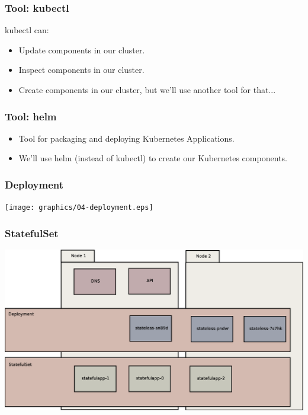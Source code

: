     \begin{frame}
        \frametitle{Tool: kubectl\footnotemark}
        kubectl can:
        \begin{itemize}
            \item Update components in our cluster.\pause
            \item Inspect components in our cluster.\pause
            \item Create components in our cluster, but we'll use another tool for that...
        \end{itemize}
    \end{frame}

    \begin{frame}
        \frametitle{Tool: helm\footnotemark}
        \begin{itemize}
            \item Tool for packaging and deploying Kubernetes Applications.
            \item We'll use helm (instead of kubectl) to create our Kubernetes components.
        \end{itemize}
    \end{frame}

    \begin{frame}
        \frametitle{Deployment}
        \texttt{[image: graphics/04-deployment.eps]}
    \end{frame}

    \begin{frame}
        \frametitle{StatefulSet}
        \includegraphics[width=\textwidth,height=0.85\textheight,keepaspectratio]{graphics/05-statefulSet.eps}
    \end{frame}

